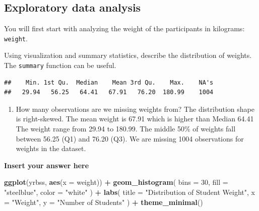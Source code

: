 \documentclass[
]{article}
\newenvironment{Shaded}{\begin{snugshade}}{\end{snugshade}}
\newcommand{\AttributeTok}[1]{\textcolor[rgb]{0.13,0.29,0.53}{#1}}
\newcommand{\DecValTok}[1]{\textcolor[rgb]{0.00,0.00,0.81}{#1}}
\newcommand{\FunctionTok}[1]{\textcolor[rgb]{0.13,0.29,0.53}{\textbf{#1}}}
\newcommand{\NormalTok}[1]{#1}
\newcommand{\SpecialCharTok}[1]{\textcolor[rgb]{0.81,0.36,0.00}{\textbf{#1}}}
\newcommand{\StringTok}[1]{\textcolor[rgb]{0.31,0.60,0.02}{#1}}
\providecommand{\tightlist}{%
  \setlength{\itemsep}{0pt}\setlength{\parskip}{0pt}}
\begin{document}
\subsection{Exploratory data analysis}\label{exploratory-data-analysis}

You will first start with analyzing the weight of the participants in
kilograms: \texttt{weight}.

Using visualization and summary statistics, describe the distribution of
weights. The \texttt{summary} function can be useful.

\begin{Shaded}
\end{Shaded}

\begin{verbatim}
##    Min. 1st Qu.  Median    Mean 3rd Qu.    Max.    NA's 
##   29.94   56.25   64.41   67.91   76.20  180.99    1004
\end{verbatim}

\begin{enumerate}
\def\labelenumi{\arabic{enumi}.}
\setcounter{enumi}{1}
\tightlist
\item
  How many observations are we missing weights from? The distribution
  shape is right-skewed. The mean weight is 67.91 which is higher than
  Median 64.41 The weight range from 29.94 to 180.99. The middle 50\% of
  weights fall between 56.25 (Q1) and 76.20 (Q3). We are missing 1004
  observations for weights in the dataset.
\end{enumerate}

\textbf{Insert your answer here}

\begin{Shaded}
\begin{Highlighting}[]
\FunctionTok{ggplot}\NormalTok{(yrbss, }\FunctionTok{aes}\NormalTok{(}\AttributeTok{x =}\NormalTok{ weight)) }\SpecialCharTok{+}
  \FunctionTok{geom\_histogram}\NormalTok{(}
    \AttributeTok{bins =} \DecValTok{30}\NormalTok{,}
    \AttributeTok{fill =} \StringTok{"steelblue"}\NormalTok{,}
    \AttributeTok{color =} \StringTok{"white"}
\NormalTok{  ) }\SpecialCharTok{+}
  \FunctionTok{labs}\NormalTok{(}
    \AttributeTok{title =} \StringTok{"Distribution of Student Weight"}\NormalTok{,}
    \AttributeTok{x =} \StringTok{"Weight"}\NormalTok{,}
    \AttributeTok{y =} \StringTok{"Number of Students"}
\NormalTok{  ) }\SpecialCharTok{+}
  \FunctionTok{theme\_minimal}\NormalTok{()}
\end{Highlighting}
\end{Shaded}
\end{document}
